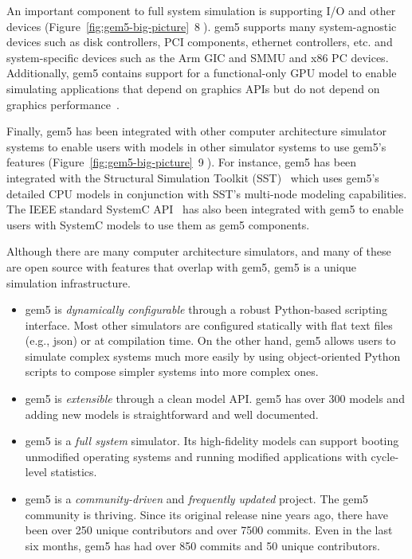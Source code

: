 An important component to full system simulation is supporting I/O and other devices (Figure~\ref{fig:gem5-big-picture}~\textcircled{8}).
gem5 supports many system-agnostic devices such as disk controllers, PCI components, ethernet controllers, etc. and system-specific devices such as the Arm GIC and SMMU and x86 PC devices.
Additionally, gem5 contains support for a functional-only GPU model to enable simulating applications that depend on graphics APIs but do not depend on graphics performance~\cite{nomali}.

Finally, gem5 has been integrated with other computer architecture simulator systems to enable users with models in other simulator systems to use gem5's features (Figure~\ref{fig:gem5-big-picture}~\textcircled{9}).
For instance, gem5 has been integrated with the Structural Simulation Toolkit (SST)~\cite{rodriguez_11,sst-gem5} which uses gem5's detailed CPU models in conjunction with SST's multi-node modeling capabilities.
The IEEE standard SystemC API~\cite{menard2017-system-systemc} has also been integrated with gem5 to enable users with SystemC models to use them as gem5 components.

Although there are many computer architecture simulators, and many of these are open source with features that overlap with gem5, gem5 is a unique simulation infrastructure.
\begin{itemize}
    \item gem5 is \emph{dynamically configurable} through a robust Python-based scripting interface. Most other simulators are configured statically with flat text files (e.g., json) or at compilation time. On the other hand, gem5 allows users to simulate complex systems much more easily by using object-oriented Python scripts to compose simpler systems into more complex ones.
    \item gem5 is \emph{extensible} through a clean model API. gem5 has over 300 models and adding new models is straightforward and well documented.
    \item gem5 is a \emph{full system} simulator. Its high-fidelity models can support booting unmodified operating systems and running modified applications with cycle-level statistics.
    \item gem5 is a \emph{community-driven} and \emph{frequently updated} project. The gem5 community is thriving. Since its original release nine years ago, there have been over 250 unique contributors and over 7500 commits. Even in the last six months, gem5 has had over 850 commits and 50 unique contributors.
\end{itemize}

